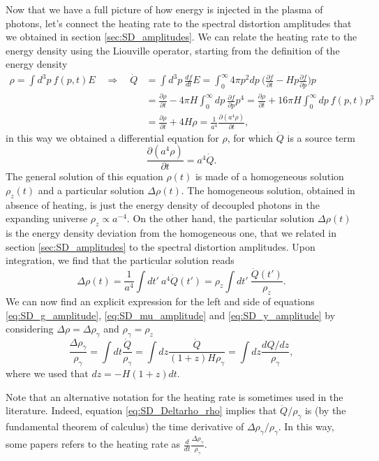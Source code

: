 Now that we have a full picture of how energy is injected in the plasma of photons, let's connect the heating rate to the spectral distortion amplitudes that we obtained in section \ref{sec:SD_amplitudes}. We can relate the heating rate to the energy density using the Liouville operator, starting from the definition of the energy density
\begin{align*}
    \rho = \int d^3p\ f(p,t)E\quad \Rightarrow\quad \dot{Q}&=\int d^3p\ \frac{df}{dt} E=\int_0^\infty 4\pi p^2dp\ \bigg(\frac{\partial f}{\partial t}-Hp\frac{\partial f}{\partial p}\bigg)p\\
    &=\frac{\partial \rho}{\partial t} -4\pi H\int_0^\infty  dp\ \frac{\partial f}{\partial p}p^4=\frac{\partial \rho}{\partial t} +16\pi H\int_0^\infty  dp\ f(p,t)p^3\\&=\frac{\partial \rho}{\partial t} +4H\rho=\frac{1}{a^4}\frac{\partial (a^4 \rho)}{\partial t},
\end{align*}
in this way we obtained a differential equation for $\rho$, for which $\dot{Q}$ is a source term
\begin{equation*}
    \frac{\partial (a^4 \rho)}{\partial t}=a^4\dot{Q}.
\end{equation*}
The general solution of this equation $\rho(t)$ is made of a homogeneous solution $\rho_z(t)$ and a particular solution $\Delta\rho(t)$. The homogeneous solution, obtained in absence of heating, is just the energy density of decoupled photons in the expanding universe $\rho_z\propto a^{-4}$. On the other hand, the particular solution $\Delta\rho(t)$ is the energy density deviation from the homogeneous one, that we related in section \ref{sec:SD_amplitudes} to the spectral distortion amplitudes. Upon integration, we find that the particular solution reads
$$\Delta\rho(t)=\frac{1}{a^4}\int dt'\ a^4\dot{Q}(t')=\rho_z\int dt'\ \frac{\dot{Q}(t')}{\rho_z}.$$
We can now find an explicit expression for the left and side of equations \eqref{eq:SD_g_amplitude}, \eqref{eq:SD_mu_amplitude} and \eqref{eq:SD_y_amplitude} by considering $\Delta\rho=\Delta\rho_\gamma$ and $\rho_\gamma=\rho_z$
\begin{equation}
    \frac{\Delta \rho_\gamma}{\rho_\gamma}=\int dt\frac{\dot Q}{\rho_\gamma}=\int dz\frac{\dot Q}{(1+z)H\rho_\gamma}=\int dz\frac{dQ/dz}{\rho_\gamma},\label{eq:SD_Deltarho_rho}
\end{equation}
where we used that $dz=-H(1+z)dt$.

Note that an alternative notation for the heating rate is sometimes used in the literature. Indeed, equation \eqref{eq:SD_Deltarho_rho} implies that $\dot Q/\rho_\gamma$ is (by the fundamental theorem of calculus) the time derivative of $\Delta\rho_\gamma/\rho_\gamma$. In this way, some papers refers to the heating rate as $\frac{d}{dt}\frac{\Delta \rho_\gamma}{\rho_\gamma}$.
